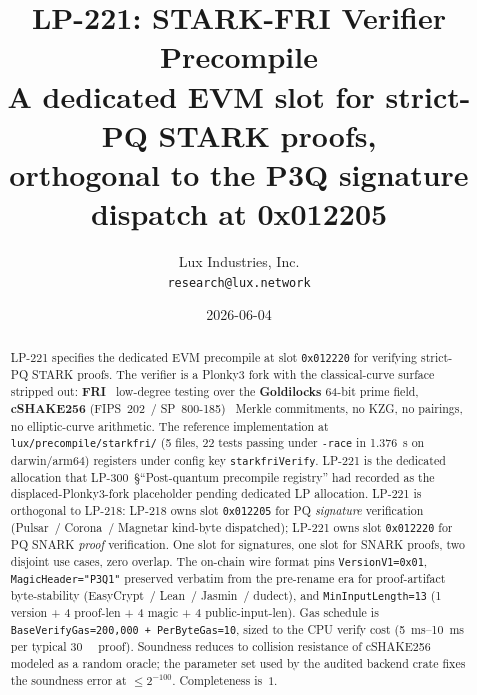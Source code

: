 \documentclass[11pt,a4paper]{article}
\title{LP-221: STARK-FRI Verifier Precompile\\
       \large A dedicated EVM slot for strict-PQ STARK proofs,\\
       orthogonal to the P3Q signature dispatch at 0x012205}
\author{Lux Industries, Inc. \\
        \texttt{research@lux.network}}
\date{2026-06-04}
\begin{document}
\luxcoverpage

\begin{abstract}
LP-221 specifies the dedicated EVM precompile at slot
\texttt{0x012220} for verifying strict-PQ STARK proofs. The verifier
is a Plonky3 fork with the classical-curve surface stripped out:
\textbf{FRI}~\cite{frieprint} low-degree testing over the
\textbf{Goldilocks} 64-bit prime field, \textbf{cSHAKE256}
(FIPS~202~/ SP~800-185)~\cite{fips202,sp800185} Merkle commitments,
no KZG, no pairings, no elliptic-curve arithmetic. The reference
implementation at \texttt{lux/precompile/starkfri/} (5 files, 22
tests passing under \texttt{-race} in \SI{1.376}{\second} on
darwin/arm64) registers under config key \texttt{starkfriVerify}.
LP-221 is the dedicated allocation that LP-300~\S``Post-quantum
precompile registry'' had recorded as the displaced-Plonky3-fork
placeholder pending dedicated LP allocation. LP-221 is orthogonal
to LP-218: LP-218 owns slot \texttt{0x012205} for PQ
\emph{signature} verification (Pulsar~/ Corona~/ Magnetar
kind-byte dispatched); LP-221 owns slot \texttt{0x012220} for PQ
SNARK \emph{proof} verification. One slot for signatures, one slot
for SNARK proofs, two disjoint use cases, zero overlap. The on-chain
wire format pins \texttt{VersionV1=0x01}, \texttt{MagicHeader="P3Q1"}
preserved verbatim from the pre-rename era for proof-artifact
byte-stability (EasyCrypt~/ Lean~/ Jasmin~/ dudect), and
\texttt{MinInputLength=13} (1 version + 4 proof-len + 4 magic + 4
public-input-len). Gas schedule is \texttt{BaseVerifyGas=200{,}000 +
PerByteGas=10}, sized to the CPU verify cost (\SIrange{5}{10}{\milli\second}
per typical \SI{30}{\kilo\byte} proof). Soundness reduces to
collision resistance of cSHAKE256 modeled as a random oracle; the
parameter set used by the audited backend crate fixes the soundness
error at $\le 2^{-100}$. Completeness is~$1$.
\end{abstract}

\tableofcontents
\newpage











\end{document}
